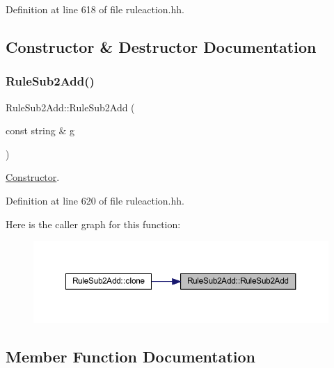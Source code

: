 Definition at line 618 of file ruleaction.\+hh.



\subsection{Constructor \& Destructor Documentation}
\mbox{\label{class_rule_sub2_add_a19f042c66f4258a0dc1c5f1ef8fea727}} 
\subsubsection{\texorpdfstring{RuleSub2Add()}{RuleSub2Add()}}
{\footnotesize\ttfamily Rule\+Sub2\+Add\+::\+Rule\+Sub2\+Add (\begin{DoxyParamCaption}\item[{const string \&}]{g }\end{DoxyParamCaption})\hspace{0.3cm}{\ttfamily [inline]}}



\mbox{\hyperlink{class_constructor}{Constructor}}. 



Definition at line 620 of file ruleaction.\+hh.

Here is the caller graph for this function\+:
\nopagebreak
\begin{figure}[H]
\begin{center}
\leavevmode
\includegraphics[width=350pt]{class_rule_sub2_add_a19f042c66f4258a0dc1c5f1ef8fea727_icgraph}
\end{center}
\end{figure}


\subsection{Member Function Documentation}
\mbox{\label{class_rule_sub2_add_adb3ba6d1c2c81fe6bc441ca0e4882e6a}} 
